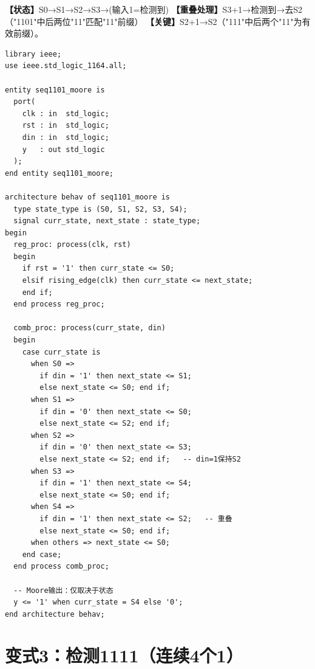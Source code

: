 \begin{detailbox}[完整教学]
\textbf{【状态】}S0→S1→S2→S3→(输入1=检测到)
\textbf{【重叠处理】}S3+1→检测到→去S2（"1101"中后两位"11"匹配"11"前缀）
\textbf{【关键】}S2+1→S2（"111"中后两个"11"为有效前缀）。

\begin{lstlisting}[caption={1101序列检测器——Moore型可重叠（5状态）}]
library ieee;
use ieee.std_logic_1164.all;

entity seq1101_moore is
  port(
    clk : in  std_logic;
    rst : in  std_logic;
    din : in  std_logic;
    y   : out std_logic
  );
end entity seq1101_moore;

architecture behav of seq1101_moore is
  type state_type is (S0, S1, S2, S3, S4);
  signal curr_state, next_state : state_type;
begin
  reg_proc: process(clk, rst)
  begin
    if rst = '1' then curr_state <= S0;
    elsif rising_edge(clk) then curr_state <= next_state;
    end if;
  end process reg_proc;

  comb_proc: process(curr_state, din)
  begin
    case curr_state is
      when S0 =>
        if din = '1' then next_state <= S1;
        else next_state <= S0; end if;
      when S1 =>
        if din = '0' then next_state <= S0;
        else next_state <= S2; end if;
      when S2 =>
        if din = '0' then next_state <= S3;
        else next_state <= S2; end if;   -- din=1保持S2
      when S3 =>
        if din = '1' then next_state <= S4;
        else next_state <= S0; end if;
      when S4 =>
        if din = '1' then next_state <= S2;   -- 重叠
        else next_state <= S0; end if;
      when others => next_state <= S0;
    end case;
  end process comb_proc;

  -- Moore输出：仅取决于状态
  y <= '1' when curr_state = S4 else '0';
end architecture behav;
\end{lstlisting}
\end{detailbox}


\section{变式3：检测1111（连续4个1）}

